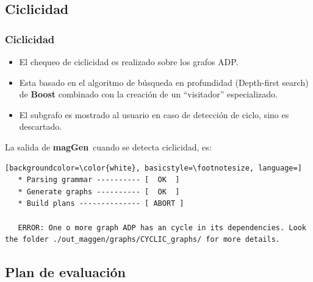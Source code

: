 \documentclass[10pt, xcolor=table, xcolor=dvipsnames]{beamer}
\newcommand{\maggen}{\textbf{magGen}}
\begin{document}
\subsection*{Ciclicidad}

\begin{frame}[fragile]
    \frametitle{Ciclicidad}

    \vspace{-0.5cm}
    \begin{block}{}
	\begin{itemize}
	    \item El chequeo de ciclicidad es realizado sobre los grafos ADP.
	    \pause
	    \item Esta basado en el algoritmo de búsqueda en profundidad (Depth-first search) de \textbf{Boost} combinado con la creación de un ``visitador'' especializado.
	    \pause
	    \item El subgrafo es mostrado al usuario en caso de detección de ciclo, sino es descartado.
	\end{itemize}
    \end{block}
    \pause

La salida de \maggen\ cuando se detecta ciclicidad, es:

\begin{lstlisting}[backgroundcolor=\color{white}, basicstyle=\footnotesize, language=] 
   * Parsing grammar ---------- [  OK  ]
   * Generate graphs ---------- [  OK  ]
   * Build plans -------------- [ ABORT ]

   ERROR: One o more graph ADP has an cycle in its dependencies. Look the folder ./out_maggen/graphs/CYCLIC_graphs/ for more details.
\end{lstlisting}
\end{frame}

\subsection*{Plan de evaluación}
\end{document}
